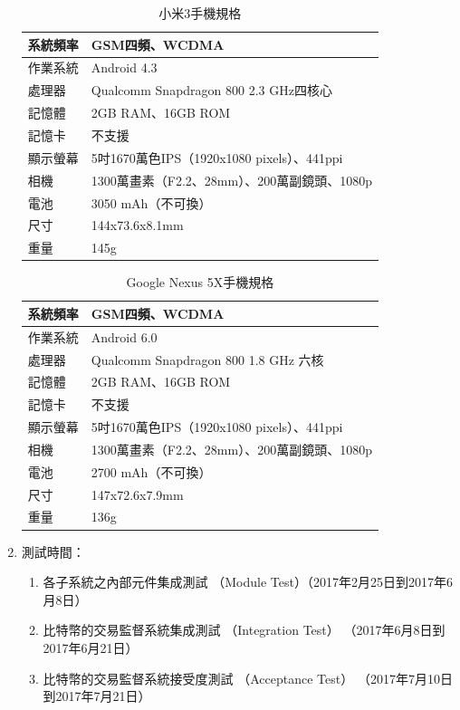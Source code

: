\begin{enumerate}
	 				\begin{table}[!htbp]
					\centering
					\caption{小米3手機規格}
					\label{mi}
					\begin{tabular}{|l|l|}
					\hline
					系統頻率 & GSM四頻、WCDMA \\ \hline
					作業系統 & Android 4.3 \\ \hline
					處理器 & Qualcomm Snapdragon 800 2.3 GHz四核心 \\ \hline
					記憶體 & 2GB RAM、16GB ROM \\ \hline
					記憶卡 & 不支援 \\ \hline
					顯示螢幕 & 5吋1670萬色IPS（1920x1080 pixels）、441ppi \\ \hline
					相機 & 1300萬畫素（F2.2、28mm）、200萬副鏡頭、1080p \\ \hline
					電池 & 3050 mAh（不可換） \\ \hline
					尺寸 & 144x73.6x8.1mm \\ \hline
					重量 & 145g \\ \hline
					\end{tabular}
					\end{table}

					\begin{table}[!htbp]
					\centering
					\caption{Google Nexus 5X手機規格}
					\label{5x}
					\begin{tabular}{|l|l|}
					\hline
					系統頻率 & GSM四頻、WCDMA \\ \hline
					作業系統 & Android 6.0 \\ \hline
					處理器 & Qualcomm Snapdragon 800 1.8 GHz 六核 \\ \hline
					記憶體 & 2GB RAM、16GB ROM \\ \hline
					記憶卡 & 不支援 \\ \hline
					顯示螢幕 & 5吋1670萬色IPS（1920x1080 pixels）、441ppi \\ \hline
					相機 & 1300萬畫素（F2.2、28mm）、200萬副鏡頭、1080p \\ \hline
					電池 & 2700 mAh（不可換） \\ \hline
					尺寸 & 147x72.6x7.9mm \\ \hline
					重量 & 136g \\ \hline
					\end{tabular}
					\end{table}

	 		\item 測試時間：

	 			\begin{enumerate}
	 				\item 各子系統之內部元件集成測試 （Module Test）（2017年2月25日到2017年6月8日）
	 				\item 比特幣的交易監督系統集成測試 （Integration Test） （2017年6月8日到2017年6月21日）
	 				\item 比特幣的交易監督系統接受度測試 （Acceptance Test） （2017年7月10日到2017年7月21日）
				\end{enumerate}


\end{enumerate}
